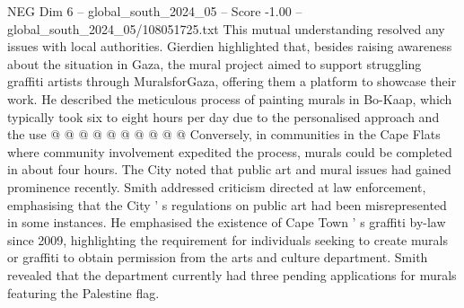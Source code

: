 \begin{textsample}{NEG Dim 6 – global\_south\_2024\_05 – Score -1.00 – global\_south\_2024\_05/108051725.txt}
This mutual understanding resolved any issues with local authorities.
Gierdien highlighted that, besides raising awareness about the situation in Gaza, the mural project aimed to support struggling graffiti artists through MuralsforGaza, offering them a platform to showcase their work.
He described the meticulous process of painting murals in Bo-Kaap, which typically took six to eight hours per day due to the personalised approach and the use @ @ @ @ @ @ @ @ @ @ Conversely, in communities in the Cape Flats where community involvement expedited the process, murals could be completed in about four hours.
The City noted that public art and mural issues had gained prominence recently.
Smith addressed criticism directed at law enforcement, emphasising that the City ' s regulations on public art had been misrepresented in some instances.
He emphasised the existence of Cape Town ' s graffiti by-law since 2009, highlighting the requirement for individuals seeking to create murals or graffiti to obtain permission from the arts and culture department.
Smith revealed that the department currently had three pending applications for murals featuring the Palestine flag.

\end{textsample}
